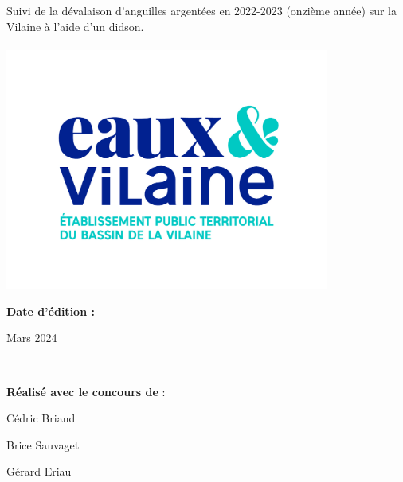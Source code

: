 \documentclass[11pt,twocolumn,titlepage,twoside]{article}
\begin{document}
\begin{titlepage}
\hfill%
\begin{minipage}{0.28\textwidth}
\par\sffamily\selectfont
\Large 
Suivi de la dévalaison d'anguilles argentées en 2022-2023 (onzième
année) sur la Vilaine à l'aide d'un didson.\\
\vspace{2cm}\\
\includegraphics[width=0.8\textwidth]{logo_EV} 
\end{minipage}

\vspace{3cm}
\hfill{ %
\begin{minipage}{0.28\textwidth}
\textbf{
Date d'édition :\\}
\color{orange_EV}
\begin{center}
\Large
Mars 2024
\end{center}
\vspace{2cm}\\
\end{minipage}
}%
       
    
\hfill{ %
\begin{minipage}{0.28\textwidth}
\textbf{Réalisé avec le concours de} : 
\vspace{1cm}\\
\end{minipage}
}%
\vfill
\hfill{ %
\begin{minipage}{0.3\textwidth}
\large
\color{bleu_EV}
\leftskip=1cm
Cédric Briand\par   
Brice Sauvaget\par
Gérard Eriau\par
\vspace{1cm}
\end{minipage}
}%
\endgroup
\end{titlepage}
\end{document}
